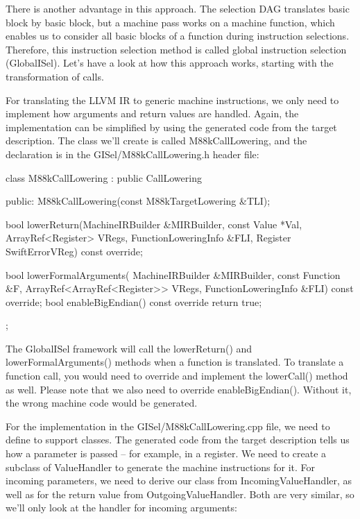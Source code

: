 There is another advantage in this approach. The selection DAG translates basic block by basic block, but a machine pass works on a machine function, which enables us to consider all basic blocks of a function during instruction selections. Therefore, this instruction selection method is called global instruction selection (GlobalISel). Let’s have a look at how this approach works, starting with the transformation of calls.



For translating the LLVM IR to generic machine instructions, we only need to implement how arguments and return values are handled. Again, the implementation can be simplified by using the generated code from the target description. The class we’ll create is called M88kCallLowering, and the declaration is in the GISel/M88kCallLowering.h header file:

\begin{cpp}
class M88kCallLowering : public CallLowering {
public:
    M88kCallLowering(const M88kTargetLowering &TLI);

    bool
    lowerReturn(MachineIRBuilder &MIRBuilder,
                const Value *Val,
                ArrayRef<Register> VRegs,
                FunctionLoweringInfo &FLI,
                Register SwiftErrorVReg) const override;

    bool lowerFormalArguments(
        MachineIRBuilder &MIRBuilder, const Function &F,
        ArrayRef<ArrayRef<Register>> VRegs,
        FunctionLoweringInfo &FLI) const override;
    bool enableBigEndian() const override { return true; }
};
\end{cpp}

The GlobalISel framework will call the lowerReturn() and lowerFormalArguments() methods when a function is translated. To translate a function call, you would need to override and implement the lowerCall() method as well. Please note that we also need to override enableBigEndian(). Without it, the wrong machine code would be generated.

For the implementation in the GISel/M88kCallLowering.cpp file, we need to define to support classes. The generated code from the target description tells us how a parameter is passed – for example, in a register. We need to create a subclass of ValueHandler to generate the machine instructions for it. For incoming parameters, we need to derive our class from IncomingValueHandler, as well as for the return value from OutgoingValueHandler. Both are very similar, so we’ll only look at the handler for incoming arguments:

